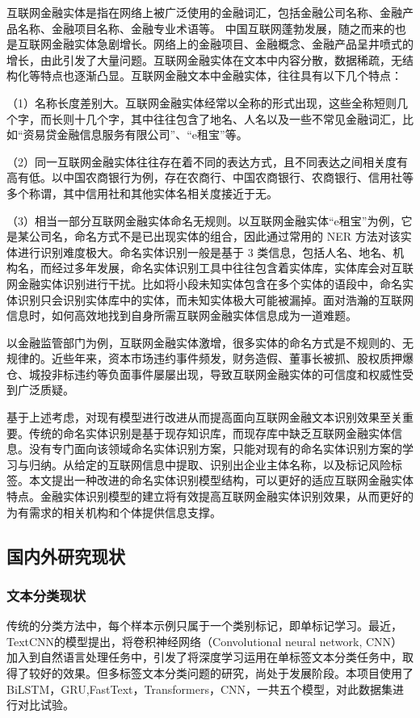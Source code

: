 \documentclass[letterpaper]{article}
\begin{document}
    互联网金融实体是指在网络上被广泛使用的金融词汇，包括金融公司名称、金融产品名称、金融项目名称、金融专业术语等。 中国互联网蓬勃发展，随之而来的也是互联网金融实体急剧增长。网络上的金融项目、金融概念、金融产品呈井喷式的增长，由此引发了大量问题。互联网金融实体在文本中内容分散，数据稀疏，无结构化等特点也逐渐凸显。互联网金融文本中金融实体，往往具有以下几个特点： 
    
    （1）名称长度差别大。互联网金融实体经常以全称的形式出现，这些全称短则几个字，而长则十几个字，其中往往包含了地名、人名以及一些不常见金融词汇，比如“资易贷金融信息服务有限公司”、“e租宝”等。
    
    （2）同一互联网金融实体往往存在着不同的表达方式，且不同表达之间相关度有高有低。以中国农商银行为例，存在农商行、中国农商银行、农商银行、信用社等多个称谓，其中信用社和其他实体名相关度接近于无。 
    
    （3）相当一部分互联网金融实体命名无规则。以互联网金融实体“e租宝”为例，它是某公司名，命名方式不是已出现实体的组合，因此通过常用的 NER 方法对该实体进行识别难度极大。命名实体识别一般是基于 3 类信息，包括人名、地名、机构名，而经过多年发展，命名实体识别工具中往往包含着实体库，实体库会对互联网金融实体识别进行干扰。比如将小段未知实体包含在多个实体的语段中，命名实体识别只会识别实体库中的实体，而未知实体极大可能被漏掉。面对浩瀚的互联网信息时，如何高效地找到自身所需互联网金融实体信息成为一道难题。
   
    以金融监管部门为例，互联网金融实体激增，很多实体的命名方式是不规则的、无规律的。近些年来，资本市场违约事件频发，财务造假、董事长被抓、股权质押爆仓、城投非标违约等负面事件屡屡出现，导致互联网金融实体的可信度和权威性受到广泛质疑。
    
    基于上述考虑，对现有模型进行改进从而提高面向互联网金融文本识别效果至关重要。传统的命名实体识别是基于现存知识库，而现存库中缺乏互联网金融实体信息。没有专门面向该领域命名实体识别方案，只能对现有的命名实体识别方案的学习与归纳。从给定的互联网信息中提取、识别出企业主体名称，以及标记风险标签。本文提出一种改进的命名实体识别模型结构，可以更好的适应互联网金融实体特点。金融实体识别模型的建立将有效提高互联网金融实体识别效果，从而更好的为有需求的相关机构和个体提供信息支撑。
  \subsection{国内外研究现状}
    \subsubsection{文本分类现状}
    传统的分类方法中，每个样本示例只属于一个类别标记，即单标记学习。最近，TextCNN的模型提出，将卷积神经网络（Convolutional neural network, CNN）加入到自然语言处理任务中，引发了将深度学习运用在单标签文本分类任务中，取得了较好的效果。但多标签文本分类问题的研究，尚处于发展阶段。本项目使用了BiLSTM，GRU,FastText，Transformers，CNN，一共五个模型，对此数据集进行对比试验。
\end{document}

